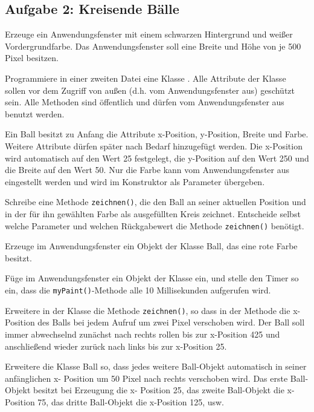 \subsection{Aufgabe 2: Kreisende Bälle}

\begin{compactenum}[a)]

\item Erzeuge ein Anwendungsfenster mit einem schwarzen Hintergrund und weißer
Vordergrundfarbe. Das Anwendungsfenster soll eine Breite und Höhe von je 500
Pixel besitzen.

\item Programmiere in einer zweiten Datei eine Klasse . Alle
Attribute der Klasse  sollen vor dem Zugriff von außen (d.h. vom
Anwendungsfenster aus) geschützt sein. Alle Methoden sind öffentlich und dürfen
vom Anwendungsfenster  aus benutzt werden.

\item Ein Ball besitzt zu Anfang die Attribute x-Position, y-Position, Breite
und Farbe. Weitere Attribute dürfen später nach Bedarf hinzugefügt werden. Die
x-Position wird automatisch auf den Wert 25 festgelegt, die y-Position auf den
Wert 250 und die Breite auf den Wert 50. Nur die Farbe kann vom
Anwendungsfenster aus eingestellt werden und wird im Konstruktor als Parameter
übergeben.

Schreibe eine Methode \verb|zeichnen()|, die den Ball an seiner aktuellen
Position und in der für ihn gewählten Farbe als ausgefüllten Kreis zeichnet.
Entscheide selbst welche Parameter und welchen Rückgabewert die Methode
\verb|zeichnen()| benötigt.

\item Erzeuge im Anwendungsfenster ein Objekt der Klasse Ball, das eine rote
Farbe besitzt.

\item Füge im Anwendungsfenster ein Objekt der Klasse  ein, und
stelle den Timer so ein, dass die \verb|myPaint()|-Methode alle 10 Millisekunden
aufgerufen wird.

\item Erweitere in der Klasse  die Methode \verb|zeichnen()|, so
dass in der Methode die x-Position des Balls bei jedem Aufruf um zwei Pixel
verschoben wird. Der Ball soll immer abwechselnd zunächst nach rechts rollen
bis zur x-Position 425 und anschließend wieder zurück nach links bis zur
x-Position 25.

\item Erweitere die Klasse Ball so, dass jedes weitere Ball-Objekt automatisch
in seiner anfänglichen x- Position um 50 Pixel nach rechts verschoben wird. Das
erste Ball-Objekt besitzt bei Erzeugung die x- Position 25, das zweite
Ball-Objekt die x-Position 75, das dritte Ball-Objekt die x-Position 125, usw.


\end{compactenum}
